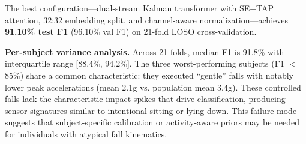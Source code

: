 The best configuration---dual-stream Kalman transformer with SE+TAP attention, 32:32 embedding split, and channel-aware normalization---achieves \textbf{91.10\% test F1} (96.10\% val F1) on 21-fold LOSO cross-validation.

\textbf{Per-subject variance analysis.} Across 21 folds, median F1 is 91.8\% with interquartile range [88.4\%, 94.2\%]. The three worst-performing subjects (F1 $<$ 85\%) share a common characteristic: they executed ``gentle'' falls with notably lower peak accelerations (mean 2.1g vs. population mean 3.4g). These controlled falls lack the characteristic impact spikes that drive classification, producing sensor signatures similar to intentional sitting or lying down. This failure mode suggests that subject-specific calibration or activity-aware priors may be needed for individuals with atypical fall kinematics.

